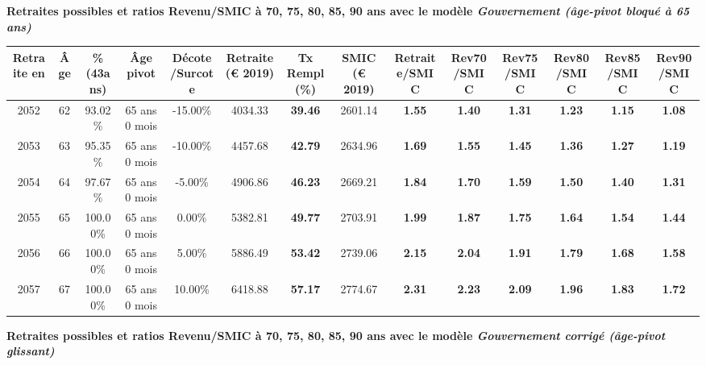 {\bf \noindent Retraites possibles et ratios Revenu/SMIC à 70, 75, 80, 85, 90 ans avec le modèle \emph{Gouvernement (âge-pivot bloqué à 65 ans)}}  
 
\begin{adjustbox}{max width=\textwidth} 
\begin{tabular}[htb]{|c|c||c|c|c||c|c||c||c|c|c|c|c|c|} 
\hline 
 Retraite en &  Âge &  \%(43ans) &  Âge pivot &  Décote/Surcote &  Retraite (\euro{} 2019) &  Tx Rempl(\%) &  SMIC (\euro{} 2019) &  Retraite/SMIC &  Rev70/SMIC &  Rev75/SMIC &  Rev80/SMIC &  Rev85/SMIC &  Rev90/SMIC \\ 
\hline \hline 
 2052 &  62 &  93.02\% &  65 ans 0 mois &  -15.00\% &  4034.33 &  {\bf 39.46} &  2601.14 &  {\bf 1.55} &  {\bf 1.40} &  {\bf 1.31} &  {\bf 1.23} &  {\bf 1.15} &  {\bf 1.08} \\ 
\hline 
 2053 &  63 &  95.35\% &  65 ans 0 mois &  -10.00\% &  4457.68 &  {\bf 42.79} &  2634.96 &  {\bf 1.69} &  {\bf 1.55} &  {\bf 1.45} &  {\bf 1.36} &  {\bf 1.27} &  {\bf 1.19} \\ 
\hline 
 2054 &  64 &  97.67\% &  65 ans 0 mois &  -5.00\% &  4906.86 &  {\bf 46.23} &  2669.21 &  {\bf 1.84} &  {\bf 1.70} &  {\bf 1.59} &  {\bf 1.50} &  {\bf 1.40} &  {\bf 1.31} \\ 
\hline 
 2055 &  65 &  100.00\% &  65 ans 0 mois &  0.00\% &  5382.81 &  {\bf 49.77} &  2703.91 &  {\bf 1.99} &  {\bf 1.87} &  {\bf 1.75} &  {\bf 1.64} &  {\bf 1.54} &  {\bf 1.44} \\ 
\hline 
 2056 &  66 &  100.00\% &  65 ans 0 mois &  5.00\% &  5886.49 &  {\bf 53.42} &  2739.06 &  {\bf 2.15} &  {\bf 2.04} &  {\bf 1.91} &  {\bf 1.79} &  {\bf 1.68} &  {\bf 1.58} \\ 
\hline 
 2057 &  67 &  100.00\% &  65 ans 0 mois &  10.00\% &  6418.88 &  {\bf 57.17} &  2774.67 &  {\bf 2.31} &  {\bf 2.23} &  {\bf 2.09} &  {\bf 1.96} &  {\bf 1.83} &  {\bf 1.72} \\ 
\hline 
\hline 
\end{tabular} 
\end{adjustbox} 
 
 \vspace{0.1cm} 
{\bf \noindent Retraites possibles et ratios Revenu/SMIC à 70, 75, 80, 85, 90 ans avec le modèle \emph{Gouvernement corrigé (âge-pivot glissant)}}  
 
